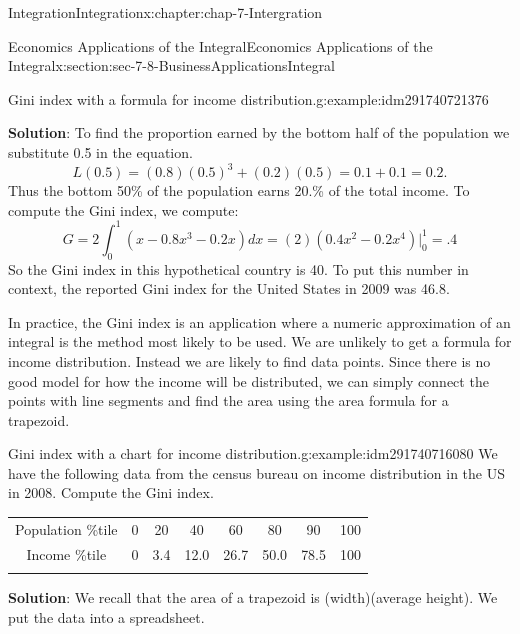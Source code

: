 \documentclass[oneside,10pt,]{book}
\newcommand{\tabularfont}{\relax}
\newcommand{\terminology}[1]{\textbf{#1}}
\numberwithin{equation}{section}
\newcommand{\hrulethin}  {\noalign{\hrule height 0.04em}}
\newcommand{\hrulemedium}{\noalign{\hrule height 0.07em}}
\newcommand{\hrulethick} {\noalign{\hrule height 0.11em}}
\begin{document}
\begin{chapterptx}{Integration}{}{Integration}{}{}{x:chapter:chap-7-Intergration}
\begin{sectionptx}{Economics Applications of the Integral}{}{Economics Applications of the Integral}{}{}{x:section:sec-7-8-BusinessApplicationsIntegral}
\begin{example}{Gini index with a formula for income distribution.}{g:example:idm291740721376}
\par
\terminology{Solution}: To find the proportion earned by the bottom half of the population we substitute 0.5 in the equation.%
%
\begin{equation*}
L(0.5)=(0.8) (0.5)^3+(0.2)(0.5)=0.1+0.1=0.2.
\end{equation*}
Thus the bottom 50\% of the population earns 20.\% of the total income. To compute the Gini index, we compute:%
%
\begin{equation*}
G=2\int_0^1 (x-0.8x^3-0.2x)dx=(2)(0.4x^2-0.2x^4 ) |_0^1=.4
\end{equation*}
So the Gini index in this hypothetical country is 40.  To put this number in context, the reported Gini index for the United States in 2009 was 46.8.%
\end{example}
In practice, the Gini index is an application where a numeric approximation of an integral is the method most likely to be used.  We are unlikely to get a formula for income distribution.  Instead we are likely to find data points.  Since there is no good model for how the income will be distributed, we can simply connect the points with line segments and find the area using the area formula for a trapezoid.%
\begin{example}{Gini index with a chart for income distribution.}{g:example:idm291740716080}%
We have the following data from the census bureau on income distribution in the US in 2008.  Compute the Gini index.%
\begin{sidebyside}{1}{0}{0}{0}%
\begin{sbspanel}{1}%
{\centering%
{\tabularfont%
\begin{tabular}{cccccccc}\hrulethick
Population \%tile&0&20&40&60&80&90&100\tabularnewline\hrulethin
Income \%tile&0&3.4&12.0&26.7&50.0&78.5&100\tabularnewline\hrulemedium
\end{tabular}
}%
\par}
\end{sbspanel}%
\end{sidebyside}%
\par
\terminology{Solution}:  We recall that the area of a trapezoid is (width)(average height).  We put the data into a spreadsheet.%
\begin{sidebyside}{1}{0.2}{0.2}{0}%
\begin{sbspanel}{0.6}%

\end{sbspanel}
\end{sidebyside}
\end{example}
\end{sectionptx}
\end{chapterptx}
\end{document}
